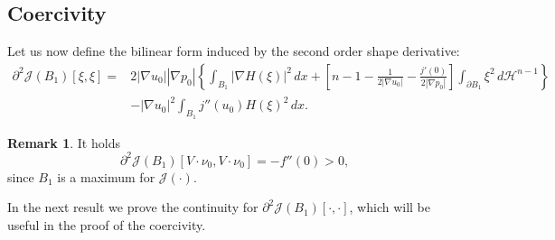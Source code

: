 \documentclass[oneside,a4paper,11pt,notitlepage]{article}
\newcommand{\abs}[1]{{\left|#1\right|}}
\theoremstyle{definition}
\theoremstyle{plain}
\theoremstyle{definition}
\newtheorem{oss}[esempio]{Remark}
\begin{document}
\subsection{Coercivity}
Let us now define the bilinear form induced by the second order shape derivative:
\begin{equation}\label{FormaBilineare}
    \begin{split}
    \partial^2 \mathcal{J}(B_1)[\xi,\xi]=&2\abs{\nabla u_0}\abs{\nabla p_0}\left\{\int_{B_1}\abs{\nabla H(\xi)}^2\,dx+\left[n-1-\frac{1}{2\abs{\nabla u_0}}-\frac{j'(0)}{2\abs{\nabla p_0}} \right]\int_{\partial B_1}\xi^2\,d\mathcal{H}^{n-1} \right\}\\
     &-\abs{\nabla u_0}^2\int_{B_1}j''(u_0)H(\xi)^2\,dx.
    \end{split}
\end{equation}
\begin{oss}\label{ossBilineare}
    It holds 
    \begin{equation*}
        \partial^2 \mathcal{J}(B_1)[V\cdot\nu_0,V\cdot\nu_0]=-f''(0)>0,
    \end{equation*}
    since $B_1$ is a maximum for $\mathcal{J}(\cdot)$.
\end{oss}

In the next result we prove the continuity for $\partial^2\mathcal{J}(B_1)[\cdot,\cdot]$, which will be useful in the proof of the coercivity.
\end{document}
